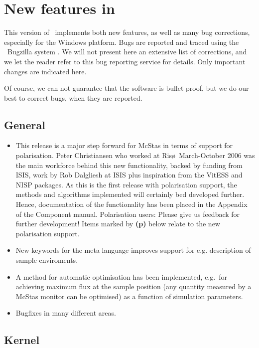 
\chapter{New features in \MCS\ \version\ }
\label{c:changes}

This version of \MCS\ implements both new features, as well as many bug corrections, especially for the Windows platform. Bugs are reported and traced using the \MCS\ Bugzilla system \cite{mczilla_webpage}. We will not present here an extensive list of corrections, and we let the reader refer to this bug reporting service for details. Only important changes are indicated here.

Of course, we can not guarantee that the software is bullet proof, but we do our best to correct bugs, when they are reported.

\section{General}
\label{s:new-features:general}
\begin{itemize}
\item  This release is a major step forward for McStas in terms of
  support for polarisation. Peter Christiansen who worked at Ris\o\
  March-October 2006 was the main workforce behind this new
  functionality, backed by funding from ISIS, work by Rob Dalgliesh at
  ISIS plus inspiration from the VitESS and NISP packages. As this is
  the first release with polarisation support, the methods and
  algorithms implemented will certainly bed developed further. Hence,
  documentation of the functionality has been placed in the Appendix
  of the Component manual. Polarisation users: Please give
  us feedback for further development! Items marked by {\bf(p)} below
  relate to the new polarisation support.
\item New keywords for the meta language improves support for e.g. description of sample enviroments.
\item A method for automatic optimisation has been implemented, e.g.~for achieving maximum flux at the sample position (any quantity measured by a McStas monitor can be optimised) as a function of simulation parameters.
\item Bugfixes in many different areas.
\end{itemize}
\section{Kernel}
\label{s:new-features:kernel}

